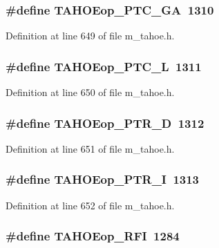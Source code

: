 \subsubsection{\setlength{\rightskip}{0pt plus 5cm}\#define TAHOEop\_\-PTC\_\-GA~1310}\label{m__tahoe_8h_507d39d83680d40cf36579a28df2cdf0}




Definition at line 649 of file m\_\-tahoe.h.
\subsubsection{\setlength{\rightskip}{0pt plus 5cm}\#define TAHOEop\_\-PTC\_\-L~1311}\label{m__tahoe_8h_b0652254a8e57cd7441f67e01edb0453}




Definition at line 650 of file m\_\-tahoe.h.
\subsubsection{\setlength{\rightskip}{0pt plus 5cm}\#define TAHOEop\_\-PTR\_\-D~1312}\label{m__tahoe_8h_d18b6748e9b7ad7dbad1120cc7c0de6e}




Definition at line 651 of file m\_\-tahoe.h.
\subsubsection{\setlength{\rightskip}{0pt plus 5cm}\#define TAHOEop\_\-PTR\_\-I~1313}\label{m__tahoe_8h_cd220f3d4b7c1d9743e63e9cf28a81f4}




Definition at line 652 of file m\_\-tahoe.h.
\subsubsection{\setlength{\rightskip}{0pt plus 5cm}\#define TAHOEop\_\-RFI~1284}\label{m__tahoe_8h_27d83d6e77dd9591e9c6812d69301b32}





